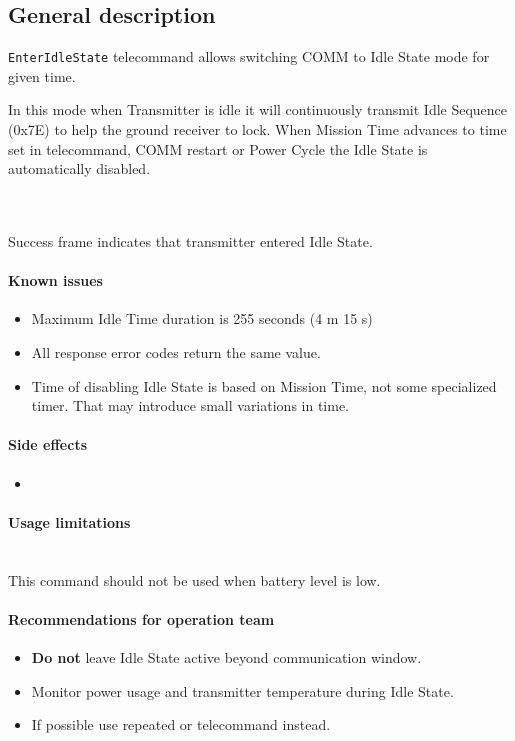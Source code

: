 

\subsection{General description}
\texttt{EnterIdleState} telecommand allows switching COMM to Idle State mode for given time.

In this mode when Transmitter is idle it will continuously transmit Idle Sequence (0x7E) to help the ground receiver to lock.
When Mission Time advances to time set in telecommand, COMM restart or Power Cycle the Idle State is automatically disabled.

\\\\
Success frame indicates that transmitter entered Idle State.

\paragraph{Known issues}
\begin{itemize}
	\item Maximum Idle Time duration is 255 seconds (4 m 15 s)
	\item All response error codes return the same value.
	\item Time of disabling Idle State is based on Mission Time, not some specialized timer. That may introduce small variations in time.
\end{itemize}

\paragraph{Side effects}
\begin{itemize}
	\item {}
\end{itemize}

\paragraph{Usage limitations}\mbox{}\\ 
This command should not be used when battery level is low.

\paragraph{Recommendations for operation team}
\begin{itemize}
	\item \textbf{Do not} leave Idle State active beyond communication window.
	\item Monitor power usage and transmitter temperature during Idle State.
	\item If possible use repeated  or  telecommand instead.
\end{itemize}

